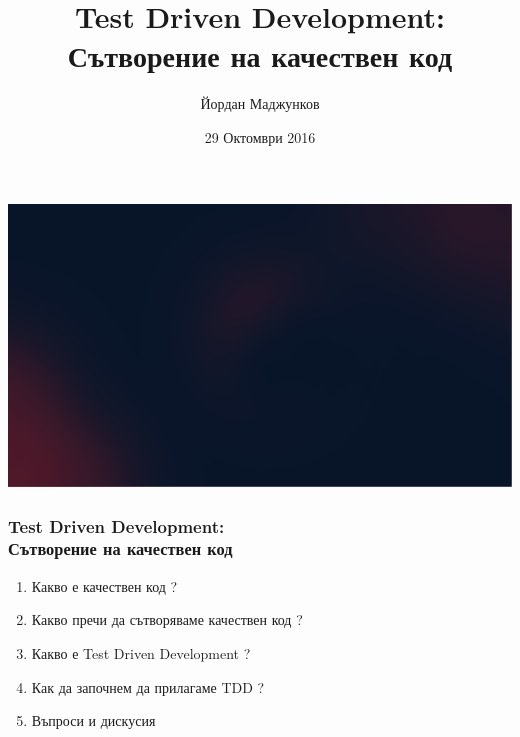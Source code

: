\documentclass[serif,mathserif,14pt,aspectratio=169]{beamer}
\author[Йордан Маджунков]{Йордан Маджунков}
\title[Test Driven Development\hspace{2em}\insertframenumber/\inserttotalframenumber]{Test Driven Development:\\ Сътворение на качествен код}
\date{29 Октомври 2016} %
\begin{document}
\maketitle

{\includegraphics[width=\paperwidth,height=\paperheight]{background2.jpg}}


\begin{frame}
\frametitle{Test Driven Development:\\ Сътворение на качествен код}
\begin{enumerate} 
    \item Какво е качествен код ?\pause
    \item Какво пречи да сътворяваме качествен код ?\pause
    \item Какво е Test Driven Development ?\pause
    \item Как да започнем да прилагаме TDD ?\pause
    \item Въпроси и дискусия 
\end{enumerate} 
\end{frame}






\end{document}
